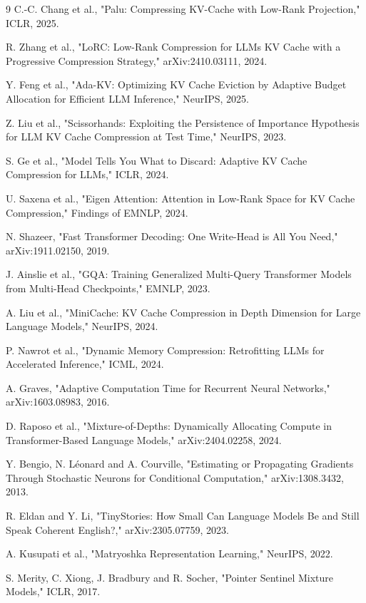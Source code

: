 \documentclass[11pt]{article}
\begin{document}
\begin{thebibliography}{9}
 C.-C. Chang et al., "Palu: Compressing KV-Cache with Low-Rank Projection," ICLR, 2025.

 R. Zhang et al., "LoRC: Low-Rank Compression for LLMs KV Cache with a Progressive Compression Strategy," arXiv:2410.03111, 2024.

 Y. Feng et al., "Ada-KV: Optimizing KV Cache Eviction by Adaptive Budget Allocation for Efficient LLM Inference," NeurIPS, 2025.

 Z. Liu et al., "Scissorhands: Exploiting the Persistence of Importance Hypothesis for LLM KV Cache Compression at Test Time," NeurIPS, 2023.

 S. Ge et al., "Model Tells You What to Discard: Adaptive KV Cache Compression for LLMs," ICLR, 2024.

 U. Saxena et al., "Eigen Attention: Attention in Low-Rank Space for KV Cache Compression," Findings of EMNLP, 2024.

 N. Shazeer, "Fast Transformer Decoding: One Write-Head is All You Need," arXiv:1911.02150, 2019.

 J. Ainslie et al., "GQA: Training Generalized Multi-Query Transformer Models from Multi-Head Checkpoints," EMNLP, 2023.

 A. Liu et al., "MiniCache: KV Cache Compression in Depth Dimension for Large Language Models," NeurIPS, 2024.

 P. Nawrot et al., "Dynamic Memory Compression: Retrofitting LLMs for Accelerated Inference," ICML, 2024.

 A. Graves, "Adaptive Computation Time for Recurrent Neural Networks," arXiv:1603.08983, 2016.

 D. Raposo et al., "Mixture-of-Depths: Dynamically Allocating Compute in Transformer-Based Language Models," arXiv:2404.02258, 2024.

 Y. Bengio, N. Léonard and A. Courville, "Estimating or Propagating Gradients Through Stochastic Neurons for Conditional Computation," arXiv:1308.3432, 2013.

 R. Eldan and Y. Li, "TinyStories: How Small Can Language Models Be and Still Speak Coherent English?," arXiv:2305.07759, 2023.

 A. Kusupati et al., "Matryoshka Representation Learning," NeurIPS, 2022.

 S. Merity, C. Xiong, J. Bradbury and R. Socher, "Pointer Sentinel Mixture Models," ICLR, 2017.


\end{thebibliography}
\end{document}
